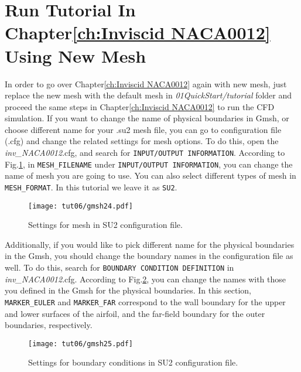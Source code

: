 \section{Run Tutorial In Chapter\ref{ch:Inviscid NACA0012} Using New Mesh}
In order to go over Chapter\ref{ch:Inviscid NACA0012} again with new mesh, just replace the new mesh with the default mesh in \textit{01QuickStart/tutorial} folder and proceed the same steps in Chapter\ref{ch:Inviscid NACA0012} to run the CFD simulation. If you want to change the name of physical boundaries in Gmsh, or choose different name for your .su2 mesh file, you can go to configuration file (.cfg) and change the related settings for mesh options. To do this, open the \textit{inv\_NACA0012}.cfg, and search for \texttt{INPUT/OUTPUT INFORMATION}. According to Fig.\ref{fig6:gmsh24}, in \texttt{MESH\_FILENAME} under \texttt{INPUT/OUTPUT INFORMATION}, you can change the name of mesh you are going to use. You can also select different types of mesh in \texttt{MESH\_FORMAT}. In this tutorial we leave it as \texttt{SU2}.
\begin{figure}[htbp]
    \centering
    \texttt{[image: tut06/gmsh24.pdf]}
    \caption{Settings for mesh in SU2 configuration file.}
    \label{fig6:gmsh24}
\end{figure}
Additionally, if you would like to pick different name for the physical boundaries in the Gmsh, you should change the boundary names in the configuration file as well. To do this, search for \texttt{BOUNDARY CONDITION DEFINITION} in \textit{inv\_NACA0012}.cfg. According to Fig.\ref{fig6:gmsh25}, you can change the names with those you defined in the Gmsh for the physical boundaries. In this section, \texttt{MARKER\_EULER} and \texttt{MARKER\_FAR} correspond to the wall boundary for the upper and lower surfaces of the airfoil, and the far-field boundary for the outer boundaries, respectively.
\begin{figure}[htbp]
    \centering
    \texttt{[image: tut06/gmsh25.pdf]}
    \caption{Settings for boundary conditions in SU2 configuration file.}
    \label{fig6:gmsh25}
\end{figure}
